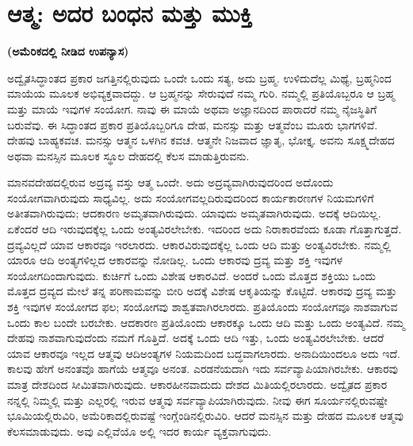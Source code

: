 \chapter{ಆತ್ಮ: ಅದರ ಬಂಧನ ಮತ್ತು ಮುಕ್ತಿ}%

\centerline{\textbf{(ಅಮೆರಿಕದಲ್ಲಿ ನೀಡಿದ ಉಪನ್ಯಾಸ)}}

ಅದ್ವೈತಸಿದ್ಧಾಂತದ ಪ್ರಕಾರ ಜಗತ್ತಿನಲ್ಲಿರುವುದು ಒಂದೇ ಒಂದು ಸತ್ಯ, ಅದು ಬ್ರಹ್ಮ. ಉಳಿದುದೆಲ್ಲ ಮಿಥ್ಯೆ, ಬ್ರಹ್ಮನಿಂದ ಮಾಯೆಯ ಮೂಲಕ ಅಭಿವ್ಯಕ್ತವಾದದ್ದು. ಆ ಬ್ರಹ್ಮನನ್ನು ಸೇರುವುದೆ ನಮ್ಮ ಗುರಿ. ನಮ್ಮಲ್ಲಿ ಪ್ರತಿಯೊಬ್ಬರೂ ಆ ಬ್ರಹ್ಮ ಮತ್ತು ಮಾಯೆ ಇವುಗಳ ಸಂಯೋಗ. ನಾವು ಈ ಮಾಯೆ ಅಥವಾ ಅಜ್ಞಾನದಿಂದ ಪಾರಾದರೆ ನಮ್ಮ ನೈಜಸ್ಥಿತಿಗೆ ಬರುವೆವು. ಈ ಸಿದ್ಧಾಂತದ ಪ್ರಕಾರ ಪ್ರತಿಯೊಬ್ಬರಿಗೂ ದೇಹ, ಮನಸ್ಸು ಮತ್ತು ಆತ್ಮವೆಂಬ ಮೂರು ಭಾಗಗಳಿವೆ. ದೇಹವು ಬಾಹ್ಯಕವಚ. ಮನಸ್ಸು ಆತ್ಮನ ಒಳಗಿನ ಕವಚ. ಆತ್ಮನೇ ನಿಜವಾದ ಜ್ಞಾತೃ, ಭೋಕ್ತೃ. ಅವನು ಸೂಕ್ಷ್ಮದೇಹದ ಅಥವಾ ಮನಸ್ಸಿನ ಮೂಲಕ ಸ್ಥೂಲ ದೇಹದಲ್ಲಿ ಕೆಲಸ ಮಾಡುತ್ತಿರುವನು.

ಮಾನವದೇಹದಲ್ಲಿರುವ ಅದ್ರವ್ಯ ವಸ್ತು ಆತ್ಮ ಒಂದೇ. ಅದು ಅದ್ರವ್ಯವಾಗಿರುವುದ\break ರಿಂದ ಅದೊಂದು ಸಂಯೋಗವಾಗಿರುವುದು ಸಾಧ್ಯವಿಲ್ಲ. ಅದು ಸಂಯೋಗವಲ್ಲದಿರುವುದರಿಂದ ಕಾರ್ಯಕಾರಣಗಳ ನಿಯಮಗಳಿಗೆ ಅತೀತವಾಗಿರುವುದು; ಆದಕಾರಣ ಅಮೃತವಾಗಿರುವುದು. ಯಾವುದು ಅಮೃತವಾಗಿರುವುದು. ಅದಕ್ಕೆ ಆದಿಯಿಲ್ಲ. ಏಕೆಂದರೆ ಆದಿ ಇರುವುದಕ್ಕೆಲ್ಲ ಒಂದು ಅಂತ್ಯವಿರಲೇಬೇಕು. ಇದರಿಂದ ಅದು ನಿರಾಕಾರವೆಂದು ಕೂಡಾ ಗೊತ್ತಾಗುತ್ತದೆ. ದ್ರವ್ಯವಿಲ್ಲದೆ ಯಾವ ಆಕಾರವೂ ಇರಲಾರದು. ಆಕಾರವಿರುವುದಕ್ಕೆಲ್ಲ ಒಂದು ಆದಿ ಮತ್ತು ಅಂತ್ಯವಿರಬೇಕು. ನಮ್ಮಲ್ಲಿ ಯಾರೂ ಆದಿ ಅಂತ್ಯಗಳಿಲ್ಲದ ಆಕಾರವನ್ನು ನೋಡಿಲ್ಲ. ಒಂದು ಆಕಾರವು ದ್ರವ್ಯ ಮತ್ತು ಶಕ್ತಿ ಇವುಗಳ ಸಂಯೋಗದಿಂದಾಗುವುದು. ಕುರ್ಚಿಗೆ ಒಂದು ವಿಶೇಷ ಆಕಾರವಿದೆ. ಅಂದರೆ ಒಂದು ಮೊತ್ತದ ಶಕ್ತಿಯು ಒಂದು ಮೊತ್ತದ ದ್ರವ್ಯದ ಮೇಲೆ ತನ್ನ ಪರಿಣಾಮವನ್ನು ಬೀರಿ ಅದಕ್ಕೆ ವಿಶೇಷ ಆಕೃತಿಯನ್ನು ಕೊಟ್ಟಿದೆ. ಆಕಾರವು ದ್ರವ್ಯ ಮತ್ತು ಶಕ್ತಿ ಇವುಗಳ ಸಂಯೋಗದ ಫಲ; ಸಂಯೋಗವು ಶಾಶ್ವತವಾಗಿರಲಾರದು. ಪ್ರತಿಯೊಂದು ಸಂಯೋಗವೂ ನಾಶವಾಗುವ ಒಂದು ಕಾಲ ಬಂದೇ ಬರಬೇಕು. ಆದಕಾರಣ ಪ್ರತಿಯೊಂದು ಆಕಾರಕ್ಕೂ ಒಂದು ಆದಿ ಮತ್ತು ಒಂದು ಅಂತ್ಯವಿದೆ. ನಮ್ಮ ದೇಹವು ನಾಶವಾಗುವುದೆಂದು ನಮಗೆ ಗೊತ್ತಿದೆ. ಅದಕ್ಕೆ ಒಂದು ಆದಿ ಇತ್ತು, ಒಂದು ಅಂತ್ಯವಿರಲೇಬೇಕು. ಆದರೆ ಯಾವ ಆಕಾರವೂ ಇಲ್ಲದ ಆತ್ಮವು ಆದಿಅಂತ್ಯಗಳ ನಿಯಮದಿಂದ ಬದ್ಧವಾಗಲಾರದು. ಅನಾದಿಯಿಂದಲೂ ಅದು ಇದೆ. ಕಾಲವು ಹೇಗೆ ಅನಂತವೊ ಹಾಗೆಯೆ ಆತ್ಮವೂ ಅನಂತ. ಎರಡನೆಯದಾಗಿ ಇದು ಸರ್ವವ್ಯಾಪಿಯಾಗಿರಬೇಕು. ಆಕಾರವು ಮಾತ್ರ ದೇಶದಿಂದ ಸೀಮಿತವಾಗಿರುವುದು. ಆಕಾರಹೀನವಾದುದು ದೇಶದ ಮಿತಿಯಲ್ಲಿರಲಾರದು. ಅದ್ವೈತದ ಪ್ರಕಾರ ನನ್ನಲ್ಲಿ ನಿಮ್ಮಲ್ಲಿ ಮತ್ತು ಎಲ್ಲರಲ್ಲಿ ಇರುವ ಆತ್ಮವು ಸರ್ವವ್ಯಾಪಿಯಾಗಿರುವುದು. ನೀವು ಈಗ ಸೂರ್ಯನಲ್ಲಿರುವಷ್ಟೇ ಭೂಮಿಯಲ್ಲಿರುವಿರಿ, ಅಮೆರಿಕಾದಲ್ಲಿರುವಷ್ಟೆ ಇಂಗ್ಲೆಂಡಿನಲ್ಲಿರುವಿರಿ. ಆದರೆ ಮನಸ್ಸಿನ ಮತ್ತು ದೇಹದ ಮೂಲಕ ಆತ್ಮವು ಕೆಲಸಮಾಡುವುದು. ಅವು ಎಲ್ಲಿವೆಯೊ ಅಲ್ಲಿ ಇದರ ಕಾರ್ಯ ವ್ಯಕ್ತವಾಗುವುದು.

